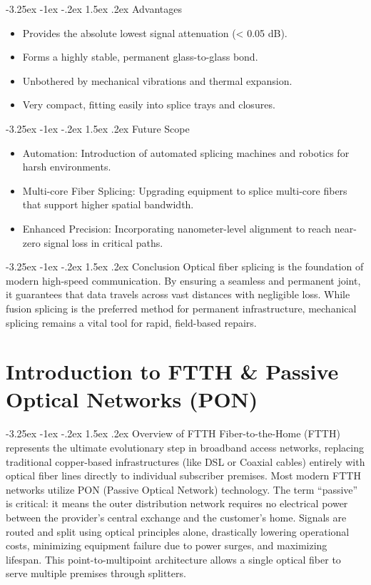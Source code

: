 \documentclass[11pt,a4paper]{report}
\makeatletter
\renewcommand{\section}{\@startsection{section}{1}{\z@}%
  {-3.25ex \@plus -1ex \@minus -.2ex}%
  {1.5ex \@plus.2ex}%
  {\normalfont\Large\bfseries\color{primaryColor}}}
\makeatother
\begin{document}
\section{Advantages}
\begin{itemize}
  \item Provides the absolute lowest signal attenuation (< 0.05 dB).
  \item Forms a highly stable, permanent glass-to-glass bond.
  \item Unbothered by mechanical vibrations and thermal expansion.
  \item Very compact, fitting easily into splice trays and closures.
\end{itemize}
\section{Future Scope}
\begin{itemize}
  \item Automation: Introduction of automated splicing machines and robotics for harsh environments.
  \item Multi-core Fiber Splicing: Upgrading equipment to splice multi-core fibers that support higher spatial bandwidth.
  \item Enhanced Precision: Incorporating nanometer-level alignment to reach near-zero signal loss in critical paths.
\end{itemize}
\section{Conclusion}
Optical fiber splicing is the foundation of modern high-speed communication. By ensuring a seamless and permanent joint, it guarantees that data travels across vast distances with negligible loss. While fusion splicing is the preferred method for permanent infrastructure, mechanical splicing remains a vital tool for rapid, field-based repairs.
\chapter{Introduction to FTTH \& Passive Optical Networks (PON)}
\section{Overview of FTTH}
Fiber-to-the-Home (FTTH) represents the ultimate evolutionary step in broadband access networks, replacing traditional copper-based infrastructures (like DSL or Coaxial cables) entirely with optical fiber lines directly to individual subscriber premises. Most modern FTTH networks utilize PON (Passive Optical Network) technology. The term ``passive'' is critical: it means the outer distribution network requires no electrical power between the provider's central exchange and the customer's home. Signals are routed and split using optical principles alone, drastically lowering operational costs, minimizing equipment failure due to power surges, and maximizing lifespan. This point-to-multipoint architecture allows a single optical fiber to serve multiple premises through splitters.
\end{document}
